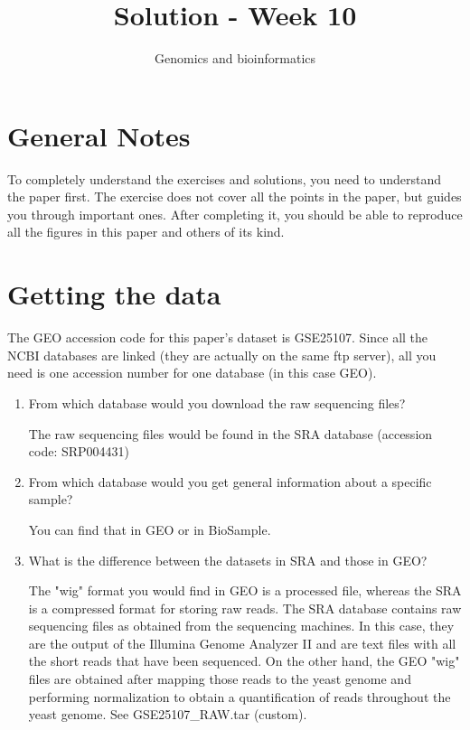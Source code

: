 \documentclass[a4paper,11pt]{article}
\title{Solution - Week 10}
\date{}
\author{Genomics and bioinformatics}
\begin{document}
\maketitle


\section{General Notes}
\indent To completely understand the exercises and solutions, you need to understand the paper first. The exercise does not cover all the points in the paper, but guides you through important ones. After completing it, you should be able to reproduce all the figures in this paper and others of its kind.


\section{Getting the data}
 The GEO accession code for this paper's dataset is GSE25107. Since all the NCBI databases are linked (they are actually on the same ftp server), all you need is one accession number for one database (in this case GEO).

\begin{enumerate}
\item From which database would you download the raw sequencing files?

The raw sequencing files would be found in the SRA database (accession code: SRP004431)
\item From which database would you get general information about a specific sample?

You can find that in GEO or in BioSample.
\item What is the difference between the datasets in SRA and those in GEO?

The "wig" format you would find in GEO is a processed file, whereas the SRA is a compressed format for storing raw reads. The SRA database contains raw sequencing files as obtained from the sequencing machines. In this case, they are the output of the Illumina Genome Analyzer II and are text files with all the short reads that have been sequenced. On the other hand, the GEO "wig" files are obtained after mapping those reads to the yeast genome and performing normalization to obtain a quantification of reads throughout the yeast genome. See GSE25107\_RAW.tar (custom).
\end{enumerate}
\end{document}
